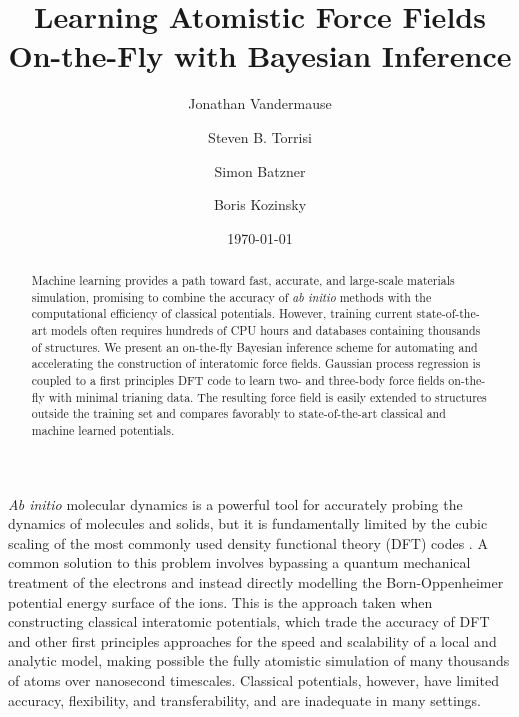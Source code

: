 \documentclass[%
reprint,
superscriptaddress,
amsmath,amssymb,
aps,
prl,
]{revtex4-1}
\begin{document}
\title{Learning Atomistic Force Fields On-the-Fly with Bayesian Inference}

\author{Jonathan Vandermause}

\author{Steven B. Torrisi}

\author{Simon Batzner}

\author{Boris Kozinsky}


\date{\today}

\begin{abstract}
  Machine learning provides a path toward fast, accurate, and large-scale materials simulation, promising to combine the accuracy of \textit{ab initio} methods with the computational efficiency of classical potentials. However, training current state-of-the-art models often requires hundreds of CPU hours and databases containing thousands of structures. We present an on-the-fly Bayesian inference scheme for automating and accelerating the construction of interatomic force fields. Gaussian process regression is coupled to a first principles DFT code to learn two- and three-body force fields on-the-fly with minimal trianing data. The resulting force field is easily extended to structures outside the training set and compares favorably to state-of-the-art classical and machine learned potentials.
\end{abstract}

\maketitle

\textit{Ab initio} molecular dynamics is a powerful tool for
accurately probing the dynamics of molecules and solids, but it is fundamentally limited by the cubic scaling of the most commonly used density functional theory (DFT) codes \cite{kohn1999nobel}. A common solution to this problem involves bypassing a quantum mechanical treatment of the electrons and instead directly modelling the Born-Oppenheimer potential energy surface of the ions. This is the approach taken when constructing classical interatomic potentials, which trade the accuracy of DFT and other first principles approaches for the speed and scalability of a local and analytic model, making possible the fully atomistic simulation of many thousands of atoms over nanosecond timescales. Classical potentials, however, have limited accuracy, flexibility, and transferability, and are inadequate in many settings.
\end{document}
